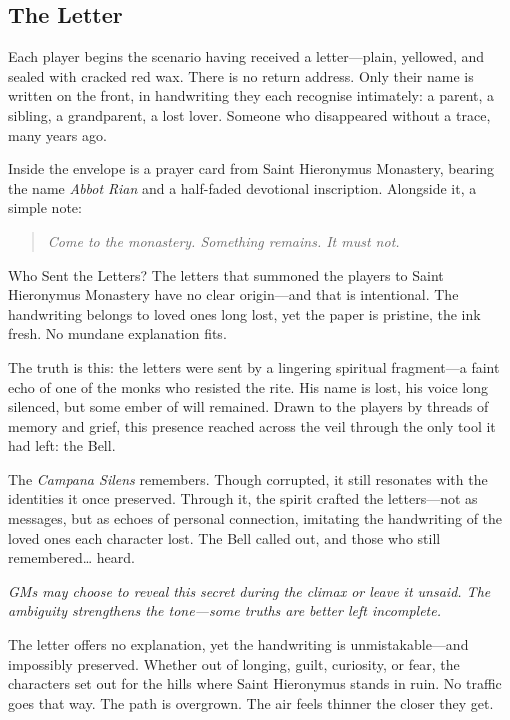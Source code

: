 \documentclass[nodeprecatedcode,bg=print]{dndbook/dndbook}
\begin{document}
\subsection*{The Letter}

Each player begins the scenario having received a letter—plain, yellowed, and sealed with cracked red wax. There is no return address. Only their name is written on the front, in handwriting they each recognise intimately: a parent, a sibling, a grandparent, a lost lover. Someone who disappeared without a trace, many years ago.

Inside the envelope is a prayer card from Saint Hieronymus Monastery, bearing the name \emph{Abbot Rian} and a half-faded devotional inscription. Alongside it, a simple note:

\begin{WyrdExample}
    \begin{quote}
        \textit{Come to the monastery. Something remains. It must not.}
    \end{quote}
\end{WyrdExample}
\begin{WyrdSidebar}[float=!b]{Who Sent the Letters?}
    The letters that summoned the players to Saint Hieronymus Monastery have no clear origin—and that is intentional. The handwriting belongs to loved ones long lost, yet the paper is pristine, the ink fresh. No mundane explanation fits.
    
    The truth is this: the letters were sent by a lingering spiritual fragment—a faint echo of one of the monks who resisted the rite. His name is lost, his voice long silenced, but some ember of will remained. Drawn to the players by threads of memory and grief, this presence reached across the veil through the only tool it had left: the Bell.
    
    The \emph{Campana Silens} remembers. Though corrupted, it still resonates with the identities it once preserved. Through it, the spirit crafted the letters—not as messages, but as echoes of personal connection, imitating the handwriting of the loved ones each character lost. The Bell called out, and those who still remembered… heard.
    
    \emph{GMs may choose to reveal this secret during the climax or leave it unsaid. The ambiguity strengthens the tone—some truths are better left incomplete.}
\end{WyrdSidebar}
    
The letter offers no explanation, yet the handwriting is unmistakable—and impossibly preserved. Whether out of longing, guilt, curiosity, or fear, the characters set out for the hills where Saint Hieronymus stands in ruin. No traffic goes that way. The path is overgrown. The air feels thinner the closer they get.
\end{document}

